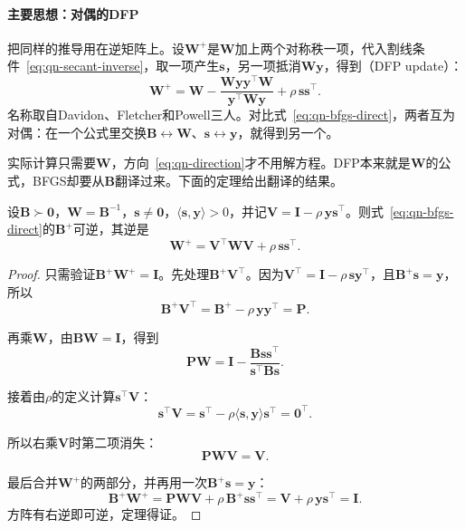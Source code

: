 \paragraph{主要思想：对偶的DFP}
把同样的推导用在逆矩阵上。设$\bm{W}^{+}$是$\bm{W}$加上两个对称秩一项，代入割线条件~\eqref{eq:qn-secant-inverse}，取一项产生$\bm{s}$，另一项抵消$\bm{W}\bm{y}$，得到（DFP update）：
\begin{equation}
 \bm{W}^{+}=\bm{W}-\frac{\bm{W}\bm{y}\bm{y}^\top\bm{W}}{\bm{y}^\top\bm{W}\bm{y}}+\rho\,\bm{s}\bm{s}^\top.
 \label{eq:qn-dfp-inverse}
\end{equation}
名称取自Davidon、Fletcher和Powell三人。对比式~\eqref{eq:qn-bfgs-direct}，两者互为对偶：在一个公式里交换$\bm{B}\leftrightarrow\bm{W}$、$\bm{s}\leftrightarrow\bm{y}$，就得到另一个。

实际计算只需要$\bm{W}$，方向~\eqref{eq:qn-direction}才不用解方程。DFP本来就是$\bm{W}$的公式，BFGS却要从$\bm{B}$翻译过来。下面的定理给出翻译的结果。

\begin{theorem}[BFGS的逆形式]
\label{thm:qn-bfgs-inverse}
设$\bm{B}\succ\bm{0}$，$\bm{W}=\bm{B}^{-1}$，$\bm{s}\neq\bm{0}$，$\langle\bm{s},\bm{y}\rangle>0$，并记$\bm{V}=\bm{I}-\rho\,\bm{y}\bm{s}^\top$。则式~\eqref{eq:qn-bfgs-direct}的$\bm{B}^{+}$可逆，其逆是
\begin{equation}
 \bm{W}^{+}=\bm{V}^\top\bm{W}\bm{V}+\rho\,\bm{s}\bm{s}^\top.
 \label{eq:qn-bfgs-inverse}
\end{equation}
\end{theorem}

\begin{proof}
只需验证$\bm{B}^{+}\bm{W}^{+}=\bm{I}$。先处理$\bm{B}^{+}\bm{V}^\top$。因为$\bm{V}^\top=\bm{I}-\rho\,\bm{s}\bm{y}^\top$，且$\bm{B}^{+}\bm{s}=\bm{y}$，所以
\[
 \bm{B}^{+}\bm{V}^\top=\bm{B}^{+}-\rho\,\bm{y}\bm{y}^\top=\bm{P}.
\]

再乘$\bm{W}$，由$\bm{B}\bm{W}=\bm{I}$，得到
\[
 \bm{P}\bm{W}=\bm{I}-\frac{\bm{B}\bm{s}\bm{s}^\top}{\bm{s}^\top\bm{B}\bm{s}}.
\]

接着由$\rho$的定义计算$\bm{s}^\top\bm{V}$：
\[
 \bm{s}^\top\bm{V}=\bm{s}^\top-\rho\langle\bm{s},\bm{y}\rangle\bm{s}^\top=\bm{0}^\top.
\]

所以右乘$\bm{V}$时第二项消失：
\[
 \bm{P}\bm{W}\bm{V}=\bm{V}.
\]

最后合并$\bm{W}^{+}$的两部分，并再用一次$\bm{B}^{+}\bm{s}=\bm{y}$：
\[
 \bm{B}^{+}\bm{W}^{+}=\bm{P}\bm{W}\bm{V}+\rho\,\bm{B}^{+}\bm{s}\bm{s}^\top=\bm{V}+\rho\,\bm{y}\bm{s}^\top=\bm{I}.
\]
方阵有右逆即可逆，定理得证。
\end{proof}

